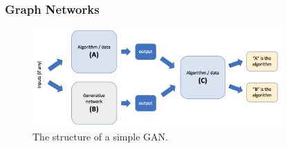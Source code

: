 \subsubsection{Graph Networks}

\begin{figure}[h]
     \centering
     \includegraphics[width=0.85\textwidth]{images/gan.png}
     \caption{The structure of a simple GAN.}
     \label{fig:gan}
 \end{figure}



